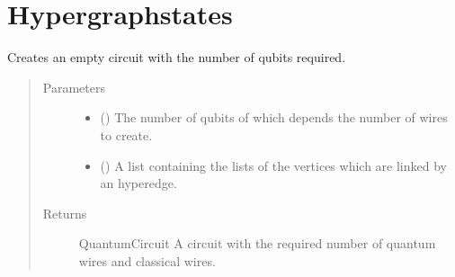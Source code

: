 \documentclass[letterpaper,10pt,english]{sphinxmanual}
\begin{document}
\chapter{Hypergraphstates}
\label{\detokenize{hypergraphstates:module-mermin_on_qiskit.hypergraphstates}}\label{\detokenize{hypergraphstates:hypergraphstates}}\label{\detokenize{hypergraphstates::doc}}

\begin{fulllineitems}
\label{\detokenize{hypergraphstates:mermin_on_qiskit.hypergraphstates.circuit_creation}}
Creates an empty circuit with the number of qubits required.
\begin{quote}\begin{description}
\item[{Parameters}] \leavevmode\begin{itemize}
\item {} 
 () \textendash{} The number of qubits of which depends the number of wires to 
create.

\item {} 
 (\sphinxstyleliteralemphasis{\sphinxupquote{{[}}}\sphinxstyleliteralemphasis{\sphinxupquote{{[}}}\sphinxstyleliteralemphasis{\sphinxupquote{{]}}}\sphinxstyleliteralemphasis{\sphinxupquote{{]}}}) \textendash{} A list containing the lists of the 
vertices which are linked by an hyperedge.

\end{itemize}

\item[{Returns}] \leavevmode
QuantumCircuit \textendash{} A circuit with the required number of quantum 
wires and classical wires.

\end{description}\end{quote}

\end{fulllineitems}
\end{document}
